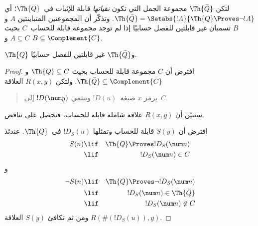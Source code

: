 \documentclass[../../../include/open-logic-section]{subfiles}
\begin{document}



لتكن $\Th{\bar Q}$ مجموعة الجمل التي تكون {\em نفياتها} قابلة
للإثبات في~$\Th{Q}$؛ أي
$\Th{\bar Q}=\Setabs{!A}{\Th{Q}\Proves\lnot !A}$. وتذكّر أن
المجموعتين المتباينتين $A$ و$B$ تسميان غير قابلتين للفصل حسابيًا إذا
لم توجد مجموعة قابلة للحساب~$C$ بحيث $A\subseteq C$ و
$B\subseteq\Complement{C}$.

\begin{lem}
$\Th{Q}$ و$\Th{\bar Q}$ غير قابلتين للفصل حسابيًا.
\end{lem}

\begin{proof}
افترض أن $C$ مجموعة قابلة للحساب بحيث $\Th{Q}\subseteq C$ و
$\Th{\bar Q}\subseteq\Complement{C}$. ولتكن $R(x,y)$ العلاقة
\begin{quote}
يرمز $x$ صيغة~$!D(u)$ وتنتمي $!D(\num y)$ إلى~$C$.
\end{quote}
سنبيّن أن $R(x,y)$ علاقة شاملة قابلة للحساب، فنحصل على تناقض.

افترض أن $S(y)$ قابلة للحساب وتمثلها $!D_S(u)$ في~$\Th{Q}$. عندئذ
\begin{eqnarray*}
S(n) & \lif & \Th{Q} \Proves !D_S(\num n) \\
& \lif & !D_S(\num n) \in C
\end{eqnarray*}
و
\begin{eqnarray*}
\lnot S(n) & \lif & \Th{Q} \Proves \lnot !D_S(\num n) \\
& \lif & !D_S(\num n) \in \Th{\bar Q} \\
& \lif & !D_S(\num n) \not\in C
\end{eqnarray*}
ومن ثم تكافئ $S(y)$ العلاقة $R(\#(!D_S(u)),y)$.
\end{proof}
\end{document}
